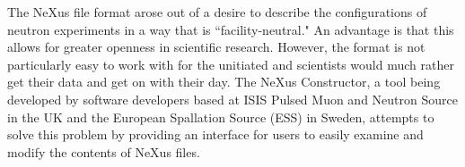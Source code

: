 The NeXus file format arose out of a desire to describe the configurations of neutron experiments in a way that is ``facility-neutral." An advantage is that this allows for greater openness in scientific research. However, the format is not particularly easy to work with for the unitiated and scientists would much rather get their data and get on with their day. The NeXus Constructor, a tool being developed by software developers based at ISIS Pulsed Muon and Neutron Source in the UK and the European Spallation Source (ESS) in Sweden, attempts to solve this problem by providing an interface for users to easily examine and modify the contents of NeXus files.
